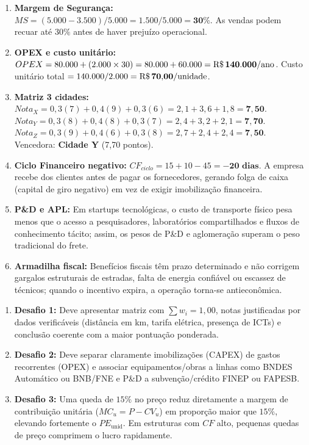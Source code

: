 \begin{boxGabarito}
\begin{enumerate}[leftmargin=1.5em, itemsep=4pt]
  \item \textbf{Margem de Segurança:} $MS = (5.000 - 3.500) / 5.000 = 1.500 / 5.000 = \mathbf{30\%}$. As vendas podem recuar até $30\%$ antes de haver prejuízo operacional.
  \item \textbf{OPEX e custo unitário:} $OPEX = 80.000 + (2.000 \times 30) = 80.000 + 60.000 = \mathbf{\text{R\$\,}{140.000/\text{ano}}}$. Custo unitário total $= 140.000 / 2.000 = \mathbf{\text{R\$\,}{70{,}00/\text{unidade}}}$.
  \item \textbf{Matriz 3 cidades:}
  $Nota_X = 0{,}3(7) + 0{,}4(9) + 0{,}3(6) = 2{,}1 + 3{,}6 + 1{,}8 = \mathbf{7{,}50}$. \\
  $Nota_Y = 0{,}3(8) + 0{,}4(8) + 0{,}3(7) = 2{,}4 + 3{,}2 + 2{,}1 = \mathbf{7{,}70}$. \\
  $Nota_Z = 0{,}3(9) + 0{,}4(6) + 0{,}3(8) = 2{,}7 + 2{,}4 + 2{,}4 = \mathbf{7{,}50}$. \\
  Vencedora: \textbf{Cidade Y} (7,70 pontos).
  \item \textbf{Ciclo Financeiro negativo:} $CF_{ciclo} = 15 + 10 - 45 = \mathbf{-20\text{ dias}}$. A empresa recebe dos clientes antes de pagar os fornecedores, gerando folga de caixa (capital de giro negativo) em vez de exigir imobilização financeira.
  \item \textbf{P\&D e APL:} Em startups tecnológicas, o custo de transporte físico pesa menos que o acesso a pesquisadores, laboratórios compartilhados e fluxos de conhecimento tácito; assim, os pesos de P\&D e aglomeração superam o peso tradicional do frete.
  \item \textbf{Armadilha fiscal:} Benefícios fiscais têm prazo determinado e não corrigem gargalos estruturais de estradas, falta de energia confiável ou escassez de técnicos; quando o incentivo expira, a operação torna-se antieconômica.
\end{enumerate}
\end{boxGabarito}

\begin{boxGabarito}
\begin{enumerate}[leftmargin=1.5em, itemsep=3pt]
  \item \textbf{Desafio 1:} Deve apresentar matriz com $\sum w_i = 1{,}00$, notas justificadas por dados verificáveis (distância em km, tarifa elétrica, presença de ICTs) e conclusão coerente com a maior pontuação ponderada.
  \item \textbf{Desafio 2:} Deve separar claramente imobilizações (CAPEX) de gastos recorrentes (OPEX) e associar equipamentos/obras a linhas como BNDES Automático ou BNB/FNE e P\&D a subvenção/crédito FINEP ou FAPESB.
  \item \textbf{Desafio 3:} Uma queda de $15\%$ no preço reduz diretamente a margem de contribuição unitária ($MC_u = P - CV_u$) em proporção maior que $15\%$, elevando fortemente o $PE_{\text{unid}}$. Em estruturas com $CF$ alto, pequenas quedas de preço comprimem o lucro rapidamente.
\end{enumerate}
\end{boxGabarito}


